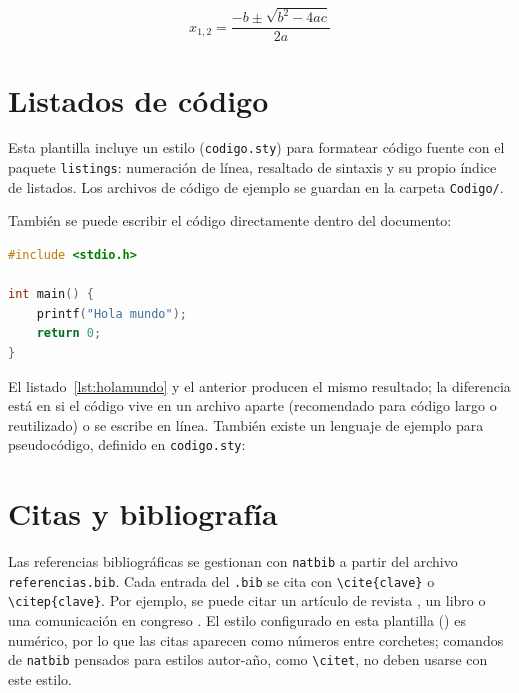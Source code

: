 \begin{equation}
  \label{ec:cuadratica}
  x_{1,2} = \frac{-b \pm \sqrt{b^2 - 4ac}}{2a}
\end{equation}

\section{Listados de código}
\label{sec:codigo}

Esta plantilla incluye un estilo (\texttt{codigo.sty}) para formatear código fuente con el paquete \texttt{listings}: numeración de línea, resaltado de sintaxis y su propio índice de listados. Los archivos de código de ejemplo se guardan en la carpeta \texttt{Codigo/}.



También se puede escribir el código directamente dentro del documento:

\begin{lstlisting}[language=C, caption={Ejemplo de listado escrito directamente en el documento.}]
#include <stdio.h>

int main() {
    printf("Hola mundo");
    return 0;
}
\end{lstlisting}

El listado~\ref{lst:holamundo} y el anterior producen el mismo resultado; la diferencia está en si el código vive en un archivo aparte (recomendado para código largo o reutilizado) o se escribe en línea. También existe un lenguaje de ejemplo para pseudocódigo, definido en \texttt{codigo.sty}:



\section{Citas y bibliografía}
\label{sec:citas}

Las referencias bibliográficas se gestionan con \texttt{natbib} a partir del archivo \texttt{referencias.bib}. Cada entrada del \texttt{.bib} se cita con \lstinline[language=enparrafo]!\cite{clave}! o \lstinline[language=enparrafo]!\citep{clave}!. Por ejemplo, se puede citar un artículo de revista \citep{ejemploarticulo}, un libro \citep{ejemplolibro} o una comunicación en congreso \citep{ejemploconferencia}. El estilo configurado en esta plantilla (\lstinline[language=enparrafo]!!) es numérico, por lo que las citas aparecen como números entre corchetes; comandos de \texttt{natbib} pensados para estilos autor-año, como \lstinline[language=enparrafo]!\citet!, no deben usarse con este estilo.

